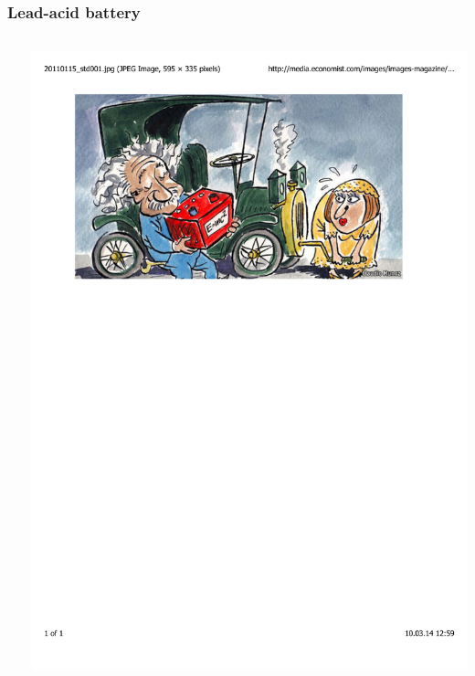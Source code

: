 \documentclass[mathserif,10pt]{beamer}
\begin{document}
\begin{frame}
    \frametitle{Lead-acid battery}
    \begin{columns}
    \begin{column}{.50\textwidth}
	\ \\
    \end{column}
    \begin{column}{.50\textwidth}
	\centering
	\includegraphics[viewport = 60 530 510 790, clip, scale=0.3]{figures/economist.pdf}
    \end{column}
    \end{columns}
\end{frame}
\end{document}
